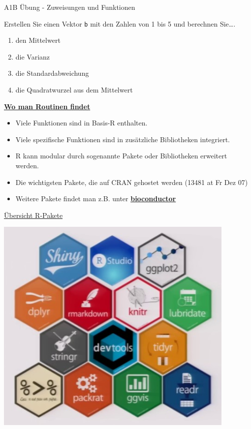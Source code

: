 \documentclass[ignorenonframetext,]{beamer}
\providecommand{\tightlist}{%
  \setlength{\itemsep}{0pt}\setlength{\parskip}{0pt}}
\begin{document}
\begin{frame}[fragile]{A1B Übung - Zuweisungen und Funktionen}

Erstellen Sie einen Vektor \texttt{b} mit den Zahlen von 1 bis 5 und
berechnen Sie\ldots{}.

\begin{enumerate}
\def\labelenumi{\arabic{enumi}.}
\item
  den Mittelwert
\item
  die Varianz
\item
  die Standardabweichung
\item
  die Quadratwurzel aus dem Mittelwert
\end{enumerate}

\end{frame}

\begin{frame}{\href{https://stats.idre.ucla.edu/r/seminars/intro/}{\textbf{Wo
man Routinen findet}}}

\begin{itemize}
\tightlist
\item
  Viele Funktionen sind in Basis-R enthalten.
\item
  Viele spezifische Funktionen sind in zusätzliche Bibliotheken
  integriert.
\item
  R kann modular durch sogenannte Pakete oder Bibliotheken erweitert
  werden.
\item
  Die wichtigsten Pakete, die auf CRAN gehostet werden (13481 at Fr Dez
  07)
\item
  Weitere Pakete findet man z.B. unter
  \href{www.bioconductor.org}{\textbf{bioconductor}}
\end{itemize}

\end{frame}

\begin{frame}{\href{https://www.youtube.com/watch?v=kKI9--Opmso}{Übersicht
R-Pakete}}

\includegraphics{figure/packages_overview.PNG}

\end{frame}
\end{document}

